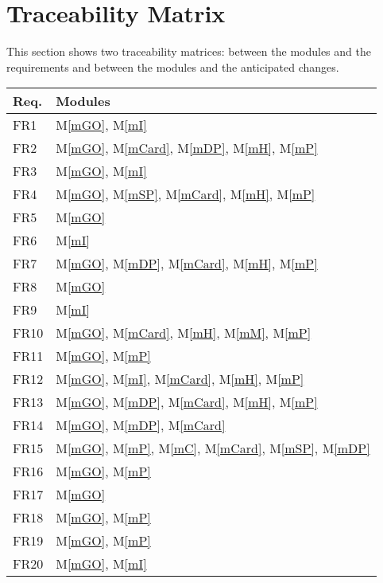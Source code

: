 \documentclass[12pt, titlepage]{article}
\newcommand{\mref}[1]{M\ref{#1}}
\begin{document}
\section{Traceability Matrix} \label{SecTM}

This section shows two traceability matrices: between the modules and the
requirements and between the modules and the anticipated changes.

\begin{table}[H]
    \centering
    \begin{tabular}{p{} p{}}
        \toprule
        \textbf{Req.} & \textbf{Modules}\\
        \midrule
        FR1 & \mref{mGO}, \mref{mI} \\
        FR2 & \mref{mGO}, \mref{mCard}, \mref{mDP}, \mref{mH}, \mref{mP} \\
        FR3 & \mref{mGO}, \mref{mI} \\
        FR4 & \mref{mGO}, \mref{mSP}, \mref{mCard}, \mref{mH}, \mref{mP} \\
        FR5 & \mref{mGO} \\
        FR6 & \mref{mI} \\
        FR7 & \mref{mGO}, \mref{mDP}, \mref{mCard}, \mref{mH}, \mref{mP} \\
        FR8 & \mref{mGO} \\
        FR9 & \mref{mI} \\
        FR10 & \mref{mGO}, \mref{mCard}, \mref{mH}, \mref{mM}, \mref{mP} \\
        FR11 & \mref{mGO}, \mref{mP} \\
        FR12 & \mref{mGO}, \mref{mI}, \mref{mCard}, \mref{mH}, \mref{mP} \\
        FR13 & \mref{mGO}, \mref{mDP}, \mref{mCard}, \mref{mH}, \mref{mP} \\
        FR14 & \mref{mGO}, \mref{mDP}, \mref{mCard} \\
        FR15 & \mref{mGO}, \mref{mP}, \mref{mC}, \mref{mCard}, \mref{mSP}, \mref{mDP} \\
        FR16 & \mref{mGO}, \mref{mP} \\
        FR17 & \mref{mGO} \\
        FR18 & \mref{mGO}, \mref{mP} \\
        FR19 & \mref{mGO}, \mref{mP} \\
        FR20 & \mref{mGO}, \mref{mI} \\

\end{tabular}
\end{table}
\end{document}

